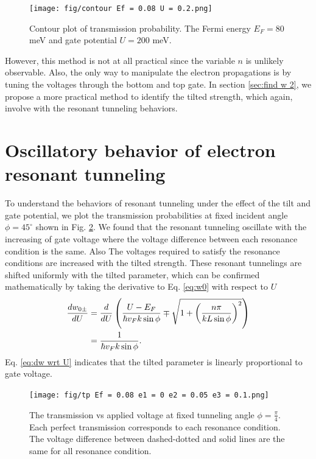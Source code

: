     \begin{figure}[H]
        \centering
            \texttt{[image: fig/contour Ef = 0.08 U = 0.2.png]}
            \caption{Contour plot of transmission probability. The Fermi energy $E_F=80$ meV and gate potential $U=200$ meV.}
        \label{fig:contour plot}
    \end{figure}

    However, this method is not at all practical since the variable $n$ is unlikely observable.
    Also, the only way to manipulate the electron propagations is by tuning the voltages through the bottom and top gate.
    In section \ref{sec:find w 2}, we propose a more practical method to identify the tilted strength, which again, involve with the resonant tunneling behaviors.

\section{Oscillatory behavior of electron resonant tunneling} \label{sec:oscillation}
    To understand the behaviors of resonant tunneling under the effect of the tilt and gate potential, 
    we plot the transmission probabilities at fixed incident angle $\phi = 45^{\circ}$ shown in Fig. \ref{fig:tp 45 deg}.
    We found that the resonant tunneling oscillate with the increasing of gate voltage where the voltage difference between each resonance condition is the same.
    Also The voltages required to satisfy the resonance conditions are increased with the tilted strength.
    These resonant tunnelings are shifted uniformly with the tilted parameter, which can be confirmed mathematically by taking the derivative to Eq. \ref{eq:w0} with respect to $U$
    \begin{align} \label{eq:dw wrt U}
        \frac{d w_{0\pm}}{dU} &= \frac{d}{dU} \left(\frac{U-E_F}{\hbar v_F k \sin{\phi}}\mp \sqrt{1+\left(\frac{n \pi}{k L \sin{\phi}}\right)^2}\right) \notag \\
                              &= \frac{1}{\hbar v_F k \sin{\phi}}.
    \end{align}
    Eq. \ref{eq:dw wrt U} indicates that the tilted parameter is linearly proportional to gate voltage.
    \begin{figure}[H]
        \centering
            \texttt{[image: fig/tp Ef = 0.08 e1 = 0 e2 = 0.05 e3 = 0.1.png]}
            \caption{The transmission vs applied voltage at fixed tunneling angle $\phi = \frac{\pi}{4}$. 
                        Each perfect transmission corresponds to each resonance condition. 
                        The voltage difference between dashed-dotted and solid lines are the same for all resonance condition.}
        \label{fig:tp 45 deg}
    \end{figure}

